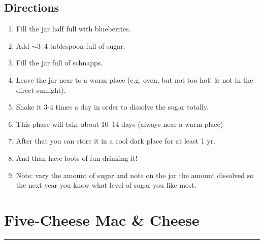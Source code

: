 \documentclass[12pt]{article}
\def \hzline{\noindent \rule[0mm]{\textwidth}{1pt}}
\begin{document}
\subsection*{Directions}
\begin{enumerate}
 \item Fill the jar half full with blueberries.
 \item Add $\sim$3--4 tablespoon full of sugar.
 \item Fill the jar full of schnapps.
 \item Leave the jar near to a warm place (e.g. oven, but not too hot! \& not in the direct sunlight).
 \item Shake it 3-4 times a day in order to dissolve the sugar totally.
 \item This phase will take about 10--14 days (always near a warm place)
 \item After that you can store it in a cool dark place for at least 1 yr.
 \item And than have loots of fun drinking it!
 \item Note: vary the amount of sugar and note on the jar the amount dissolved
          so the next year you know what level of sugar you like most.
\end{enumerate}

\newpage
\section*{Five-Cheese Mac \& Cheese} \hzline \\
\end{document}
